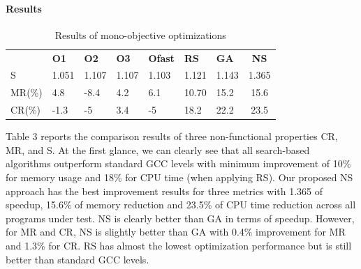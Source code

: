 





\paragraph{Results}


\vspace{-1.2em}
\begin{table}[h]
	\centering
	\caption{Results of mono-objective optimizations}
	\label{my-label}
	\begin{tabular}{|l|l|l|l|l|l|l|c|}
		\hline
		& \textbf{O1}                    & \textbf{O2}                    & \textbf{O3}                    & \textbf{Ofast}                 & \textbf{RS}                    & \textbf{GA}                    & 
		\textbf{NS} \\
		\hhline{|=|=|=|=|=|=|=|=|}
		S  &  1.051 & 1.107  & 1.107  & 1.103  & 1.121  &  1.143 &  1.365  \\ \hline
		MR(\%) & 4.8  & -8.4  &  4.2 & 6.1  &  10.70 & 15.2  &  15.6  \\ \hline
		CR(\%) & -1.3  & -5  & 3.4  & -5  &  18.2 & 22.2  &  23.5  \\ \hline
	\end{tabular}
\end{table}
Table 3 reports the comparison results of three non-functional properties CR, MR, and S. At the first glance, we can clearly see that all search-based algorithms outperform standard GCC levels with minimum improvement of 10\% for memory usage and 18\% for CPU time (when applying RS). 
Our proposed NS approach has the best improvement results for three metrics with 1.365 of speedup, 15.6\% of memory reduction and 23.5\% of CPU time reduction across all programs under test. NS is clearly better than GA in terms of speedup. However, for MR and CR, NS is slightly better than GA with 0.4\% improvement for MR and 1.3\% for CR. RS has almost the lowest optimization performance but is still better than standard GCC levels.

